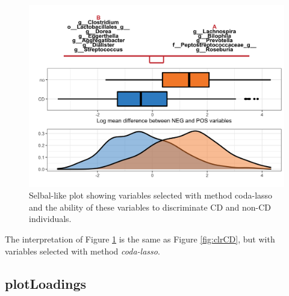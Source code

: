\documentclass[openany]{book}
\newenvironment{Shaded}{\begin{snugshade}}{\end{snugshade}}
\newcommand{\KeywordTok}[1]{\textcolor[rgb]{0.13,0.29,0.53}{\textbf{#1}}}
\newcommand{\DataTypeTok}[1]{\textcolor[rgb]{0.13,0.29,0.53}{#1}}
\newcommand{\StringTok}[1]{\textcolor[rgb]{0.31,0.60,0.02}{#1}}
\newcommand{\CommentTok}[1]{\textcolor[rgb]{0.56,0.35,0.01}{\textit{#1}}}
\newcommand{\OperatorTok}[1]{\textcolor[rgb]{0.81,0.36,0.00}{\textbf{#1}}}
\newcommand{\NormalTok}[1]{#1}
\begin{document}
\begin{Shaded}
\end{Shaded}

\begin{figure}

{\centering \includegraphics[width=1\linewidth]{./Generated_plots/codaCD-1} 

}

\caption{Selbal-like plot showing variables selected with method coda-lasso and the ability of these variables to discriminate CD and non-CD individuals.}\label{fig:codaCD}
\end{figure}

The interpretation of Figure \ref{fig:codaCD} is the same as Figure
\ref{fig:clrCD}, but with variables selected with method
\emph{coda-lasso}.

\subsection{plotLoadings}\label{plotloadings}
\end{document}
